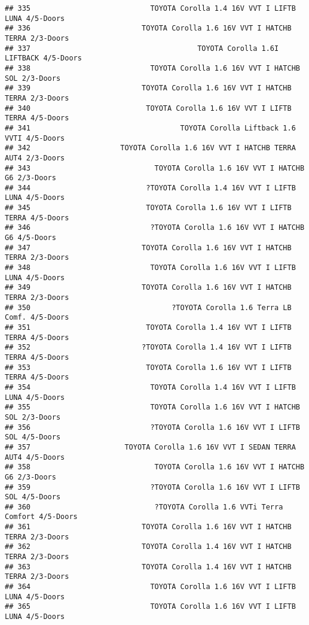 \documentclass[]{article}
\begin{document}
\begin{verbatim}
## 335                            TOYOTA Corolla 1.4 16V VVT I LIFTB LUNA 4/5-Doors
## 336                          TOYOTA Corolla 1.6 16V VVT I HATCHB TERRA 2/3-Doors
## 337                                       TOYOTA Corolla 1.6I LIFTBACK 4/5-Doors
## 338                            TOYOTA Corolla 1.6 16V VVT I HATCHB SOL 2/3-Doors
## 339                          TOYOTA Corolla 1.6 16V VVT I HATCHB TERRA 2/3-Doors
## 340                           TOYOTA Corolla 1.6 16V VVT I LIFTB TERRA 4/5-Doors
## 341                                   TOYOTA Corolla Liftback 1.6 VVTI 4/5-Doors
## 342                     TOYOTA Corolla 1.6 16V VVT I HATCHB TERRA AUT4 2/3-Doors
## 343                             TOYOTA Corolla 1.6 16V VVT I HATCHB G6 2/3-Doors
## 344                           ?TOYOTA Corolla 1.4 16V VVT I LIFTB LUNA 4/5-Doors
## 345                           TOYOTA Corolla 1.6 16V VVT I LIFTB TERRA 4/5-Doors
## 346                            ?TOYOTA Corolla 1.6 16V VVT I HATCHB G6 4/5-Doors
## 347                          TOYOTA Corolla 1.6 16V VVT I HATCHB TERRA 2/3-Doors
## 348                            TOYOTA Corolla 1.6 16V VVT I LIFTB LUNA 4/5-Doors
## 349                          TOYOTA Corolla 1.6 16V VVT I HATCHB TERRA 2/3-Doors
## 350                                 ?TOYOTA Corolla 1.6 Terra LB Comf. 4/5-Doors
## 351                           TOYOTA Corolla 1.4 16V VVT I LIFTB TERRA 4/5-Doors
## 352                          ?TOYOTA Corolla 1.4 16V VVT I LIFTB TERRA 4/5-Doors
## 353                           TOYOTA Corolla 1.6 16V VVT I LIFTB TERRA 4/5-Doors
## 354                            TOYOTA Corolla 1.4 16V VVT I LIFTB LUNA 4/5-Doors
## 355                            TOYOTA Corolla 1.6 16V VVT I HATCHB SOL 2/3-Doors
## 356                            ?TOYOTA Corolla 1.6 16V VVT I LIFTB SOL 4/5-Doors
## 357                      TOYOTA Corolla 1.6 16V VVT I SEDAN TERRA AUT4 4/5-Doors
## 358                             TOYOTA Corolla 1.6 16V VVT I HATCHB G6 2/3-Doors
## 359                            ?TOYOTA Corolla 1.6 16V VVT I LIFTB SOL 4/5-Doors
## 360                             ?TOYOTA Corolla 1.6 VVTi Terra Comfort 4/5-Doors
## 361                          TOYOTA Corolla 1.6 16V VVT I HATCHB TERRA 2/3-Doors
## 362                          TOYOTA Corolla 1.4 16V VVT I HATCHB TERRA 2/3-Doors
## 363                          TOYOTA Corolla 1.4 16V VVT I HATCHB TERRA 2/3-Doors
## 364                            TOYOTA Corolla 1.6 16V VVT I LIFTB LUNA 4/5-Doors
## 365                            TOYOTA Corolla 1.6 16V VVT I LIFTB LUNA 4/5-Doors

\end{verbatim}
\end{document}
